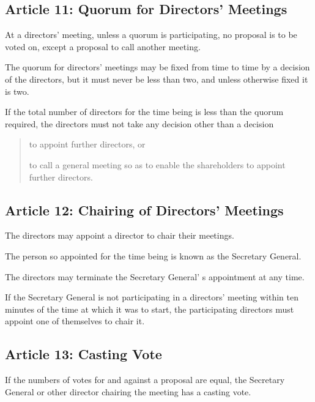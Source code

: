 \documentclass[letterpaper,10pt,openany,oneside,english]{sphinxmanual}
\begin{document}
\subsection{Article 11: Quorum for Directors’ Meetings}
\label{\detokenize{directors:article-11-quorum-for-directors-meetings}}\label{\detokenize{directors:article-11}}
 At a directors’ meeting, unless a quorum is participating, no proposal is to be voted on, except a proposal to call another meeting.

 The quorum for directors’ meetings may be fixed from time to time by a decision of the directors, but it must never be less than two, and unless otherwise fixed it is two.

 If the total number of directors for the time being is less than the quorum required, the directors must not take any decision other than a decision
\begin{quote}

 to appoint further directors, or

 to call a general meeting so as to enable the shareholders to appoint further directors.
\end{quote}


\subsection{Article 12: Chairing of Directors’ Meetings}
\label{\detokenize{directors:article-12-chairing-of-directors-meetings}}\label{\detokenize{directors:article-12}}
 The directors may appoint a director to chair their meetings.

 The person so appointed for the time being is known as the Secretary General.

 The directors may terminate the Secretary General’ s appointment at any time.

 If the Secretary General is not participating in a directors’ meeting within ten minutes of the time at which it was to start, the participating directors must appoint one of themselves to chair it.


\subsection{Article 13: Casting Vote}
\label{\detokenize{directors:article-13-casting-vote}}\label{\detokenize{directors:article-13}}
 If the numbers of votes for and against a proposal are equal, the Secretary General or other director chairing the meeting has a casting vote.
\end{document}
